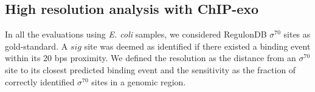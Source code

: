 \documentclass{bmcart}
\newcommand{\SK}[1]{\textcolor{red}{SK: #1}}
\newcommand{\sig}{\sigma^{70}}
\begin{document}









\subsection*{High resolution analysis with ChIP-exo}

In all the evaluations using \textit{E. coli} samples, 
we considered RegulonDB \cite{regulondb} $\sig$ sites as gold-standard. A $sig$ site was deemed 
as identified  if there existed a binding event within its  20 bps proximity. We defined the
resolution as the distance from an $\sig$ site to its closest
predicted binding event and the sensitivity as the fraction of correctly identified
$\sig$ sites in a genomic region.
\end{document}
